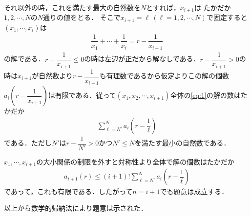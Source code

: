 \documentclass[../../main.tex]{subfiles}
\begin{document}
それ以外の時，これを満たす最大の自然数を$N$とすれば，$x_{i+1}$は たかだか$1,2,\cdots, N$の$N$通りの値をとる．
そこで$x_{i+1}=\ell\ (\ell=1,2,\cdots, N)$で固定すると$(x_1,\cdots,x_i)$は
\begin{align}
  \dfrac{1}{x_1}+\cdots+\dfrac{1}{x_{i}} = r-\dfrac{1}{x_{i+1}}
\end{align}
の解である．$r-\dfrac{1}{x_{i+1}} \le 0$の時は左辺が正だから解なしである．$r-\dfrac{1}{x_{i+1}} > 0$の時は$x_{i+1}$が自然数より$r-\dfrac{1}{x_{i+1}}$も有理数であるから仮定よりこの解の個数$a_{i}\left(r-\dfrac{1}{x_{i+1}}\right)$は有限である．従って$(x_1,x_2,\cdots,x_{i+1})$全体の\cref{eq:1}の解の数はたかだか
\begin{align}
  \sum_{\ell=N'}^{N}a_{i}\left(r-\dfrac{1}{\ell}\right)
\end{align}
である．ただし$N'$は$r-\dfrac{1}{N'} > 0$かつ$N' \le N$を満たす最小の自然数である．

$x_1,\cdots,x_{i+1}$の大小関係の制限を外すと対称性より全体で解の個数はたかだか
\begin{align}
  a_{i+1}\left(r\right) \le (i+1)!\sum_{\ell=N'}^{N}a_{i}\left(r-\dfrac{1}{\ell}\right)
\end{align}
であって，これも有限である．したがって$n=i+1$でも題意は成立する．

以上から数学的帰納法により題意は示された．

\newpage
\end{document}

